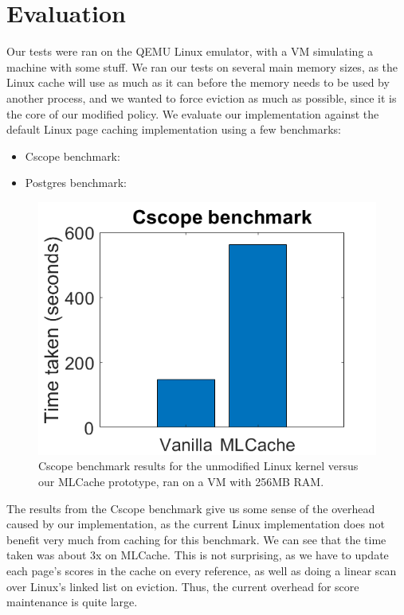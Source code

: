 \section{Evaluation}

Our tests were ran on the QEMU Linux emulator, with a VM simulating a machine with some stuff. We ran our tests on several main memory sizes, as the Linux cache will use as much as it can before the memory needs to be used by another process, and we wanted to force eviction as much as possible, since it is the core of our modified policy. We evaluate our implementation against the default Linux page caching implementation using a few benchmarks:

\begin{itemize}
	\item Cscope benchmark: 
	\item Postgres benchmark:
\end{itemize}


\label{fig:cscope}
\begin{figure}[h]
	\includegraphics[scale=0.4]{img/cscope_results_bigger.png}
	\caption{Cscope benchmark results for the unmodified Linux kernel versus our MLCache prototype, ran on a VM with 256MB RAM.}
\end{figure}


The results from the Cscope benchmark give us some sense of the overhead caused by our implementation, as the current Linux implementation does not benefit very much from caching for this benchmark. We can see that the time taken was about 3x on MLCache. This is not surprising, as we have to update each page's scores in the cache on every reference, as well as doing a linear scan over Linux's linked list on eviction. Thus, the current overhead for score maintenance is quite large.

